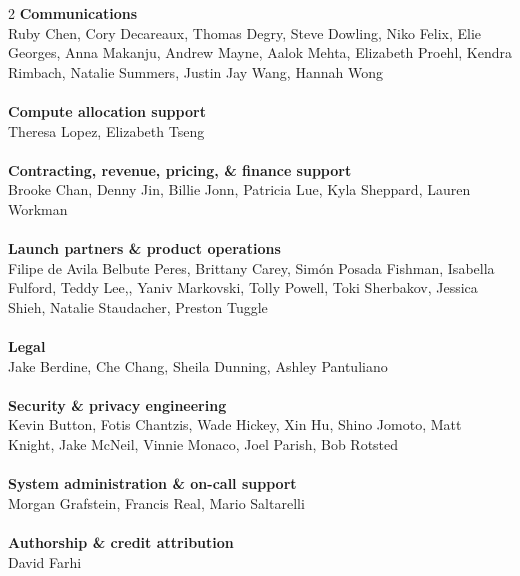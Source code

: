 \documentclass{article}
\newcommand{\creditlistheader}[1]{\textbf{#1}\footnotemark[\thefootnote]\\}
\newcommand{\creditlist}[2]{\creditlistheader{#1}#2\\
\\}
\begin{document}
\begin{multicols}{2}
\creditlist{Communications}{Ruby Chen, Cory Decareaux, Thomas Degry, Steve Dowling, Niko Felix, Elie Georges, Anna Makanju, Andrew Mayne, Aalok Mehta, Elizabeth Proehl, Kendra Rimbach, Natalie Summers, Justin Jay Wang, Hannah Wong}
\creditlist{Compute allocation support}{Theresa Lopez, Elizabeth Tseng}
\creditlist{Contracting, revenue, pricing, \& finance support}{Brooke Chan, Denny Jin, Billie Jonn, Patricia Lue, Kyla Sheppard, Lauren Workman}
\creditlist{Launch partners \& product operations}{Filipe de Avila Belbute Peres, Brittany Carey, Sim\'on Posada Fishman, Isabella Fulford, Teddy Lee,, Yaniv Markovski, Tolly Powell, Toki Sherbakov, Jessica Shieh, Natalie Staudacher, Preston Tuggle}
\creditlist{Legal}{Jake Berdine, Che Chang, Sheila Dunning, Ashley Pantuliano}
\creditlist{Security \& privacy engineering}{Kevin Button, Fotis Chantzis, Wade Hickey, Xin Hu, Shino Jomoto, Matt Knight, Jake McNeil, Vinnie Monaco, Joel Parish, Bob Rotsted}
\creditlist{System administration \& on-call support}{Morgan Grafstein, Francis Real, Mario Saltarelli}
\creditlist{Authorship \& credit attribution}{David Farhi}

\end{multicols}
\end{document}
